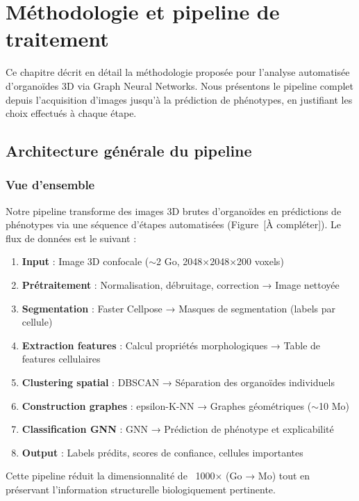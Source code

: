 
\chapter{Méthodologie et pipeline de traitement}

Ce chapitre décrit en détail la méthodologie proposée pour l'analyse automatisée d'organoïdes 3D via Graph Neural Networks. Nous présentons le pipeline complet depuis l'acquisition d'images jusqu'à la prédiction de phénotypes, en justifiant les choix effectués à chaque étape.

\section{Architecture générale du pipeline}

\subsection{Vue d'ensemble}

Notre pipeline transforme des images 3D brutes d'organoïdes en prédictions de phénotypes via une séquence d'étapes automatisées (Figure~[À compléter]). Le flux de données est le suivant :

\begin{enumerate}
    \item \textbf{Input} : Image 3D confocale ($\sim$2 Go, 2048×2048×200 voxels)
    \item \textbf{Prétraitement} : Normalisation, débruitage, correction → Image nettoyée
    \item \textbf{Segmentation} : Faster Cellpose → Masques de segmentation (labels par cellule)
    \item \textbf{Extraction features} : Calcul propriétés morphologiques → Table de features cellulaires
    \item \textbf{Clustering spatial} : DBSCAN → Séparation des organoïdes individuels
    \item \textbf{Construction graphes} : epsilon-K-NN → Graphes géométriques ($\sim$10 Mo)
    \item \textbf{Classification GNN} : GNN → Prédiction de phénotype et explicabilité
    \item \textbf{Output} : Labels prédits, scores de confiance, cellules importantes
\end{enumerate}

Cette pipeline réduit la dimensionnalité de ~1000× (Go → Mo) tout en préservant l'information structurelle biologiquement pertinente.


